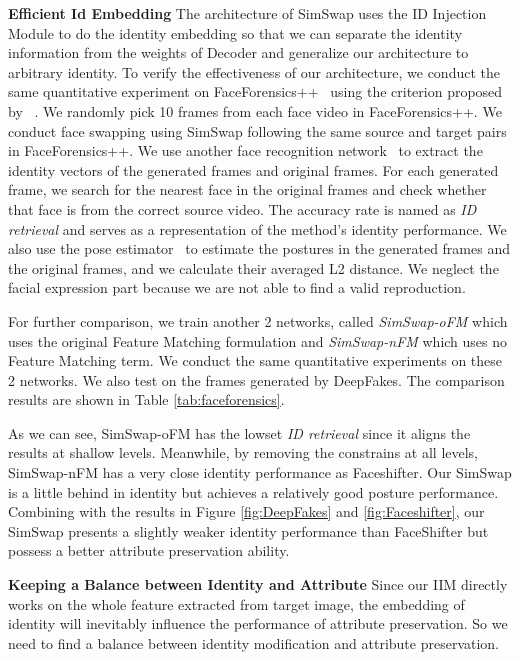 \documentclass[sigconf]{acmart}
\begin{document}
\noindent\textbf{Efficient Id Embedding} The architecture of SimSwap uses the ID Injection Module to do the identity embedding so that we can separate the identity information from the weights of Decoder and generalize our architecture to arbitrary identity. To verify the effectiveness of our architecture, we conduct the same quantitative experiment on FaceForensics++~\cite{DBLP:faceforensics} using the criterion proposed by ~\cite{DBLP:FaceShifter}. We randomly pick 10 frames from each face video in FaceForensics++. We conduct face swapping using SimSwap following the same source and target pairs in FaceForensics++. We use another face recognition network~\cite{DBLP:cosface,CosFace_github} to extract the identity vectors of the generated frames and original frames. For each generated frame, we search for the nearest face in the original frames and check whether that face is from the correct source video. The accuracy rate is named as \textit{ID retrieval} and serves as a representation of the method's identity performance. We also use the pose estimator~\cite{DBLP:poseEstimation} to estimate the postures in the generated frames and the original frames, and we calculate their averaged L2 distance. We neglect the facial expression part because we are not able to find a valid reproduction. 

For further comparison, we train another 2 networks, called \emph{SimSwap-oFM} which uses the original Feature Matching formulation and \emph{SimSwap-nFM} which uses no Feature Matching term. We conduct the same quantitative experiments on these 2 networks. We also test on the frames generated by DeepFakes. The comparison results are shown in Table \ref{tab:faceforensics}.

As we can see, SimSwap-oFM has the lowset \textit{ID retrieval} since it aligns the results at shallow levels. Meanwhile, by removing the constrains at all levels, SimSwap-nFM has a very close identity performance as Faceshifter. Our SimSwap is a little behind in identity but achieves a relatively good posture performance. Combining with the results in Figure \ref{fig:DeepFakes} and \ref{fig:Faceshifter}, our SimSwap presents a slightly weaker identity performance than FaceShifter but possess a better attribute preservation ability.





\noindent\textbf{Keeping a Balance between Identity and Attribute} Since our IIM directly works on the whole feature  extracted from target image, the embedding of identity will inevitably influence the performance of attribute preservation. So we need to find a balance between identity modification and attribute preservation.
\end{document}

